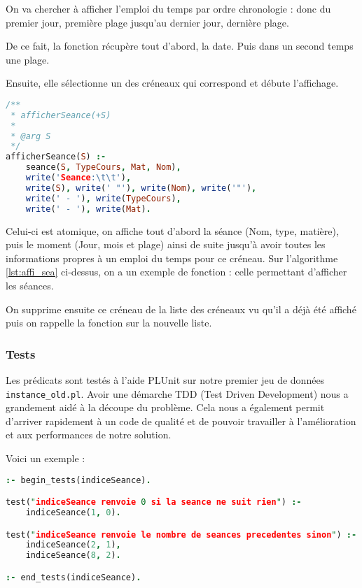 On va chercher à afficher l'emploi du temps par ordre chronologie : donc du premier jour, première plage jusqu'au dernier jour, dernière plage.

De ce fait, la fonction récupère tout d'abord, la date. Puis dans un second temps une plage.

Ensuite, elle sélectionne un des créneaux qui correspond et débute l'affichage.

\begin{lstlisting}[language=Prolog, caption=Affichage, captionpos=b,
label={lst:affi_sea}]
/**
 * afficherSeance(+S)
 *
 * @arg S
 */
afficherSeance(S) :-
    seance(S, TypeCours, Mat, Nom),
    write('Seance:\t\t'),
    write(S), write(' "'), write(Nom), write('"'),
    write(' - '), write(TypeCours),
    write(' - '), write(Mat).
\end{lstlisting}

Celui-ci est atomique, on affiche tout d'abord la séance (Nom, type, matière), puis le moment (Jour, mois et plage) ainsi de suite jusqu'à avoir toutes les informations propres à un emploi du temps pour ce créneau.
Sur l'algorithme \ref{lst:affi_sea} ci-dessus, on a un exemple de fonction : celle permettant d'afficher les séances.

On supprime ensuite ce créneau de la liste des créneaux vu qu'il a déjà été affiché puis on rappelle la fonction sur la nouvelle liste.

\subsubsection{Tests}

Les prédicats sont testés à l'aide PLUnit sur notre premier jeu de données
\texttt{instance\_old.pl}. Avoir une démarche TDD (Test Driven Development) nous
a grandement aidé à la découpe du problème. Cela nous a également permit
d'arriver rapidement à un code de qualité et de pouvoir travailler à
l'amélioration et aux performances de notre solution.

Voici un exemple :

\begin{lstlisting}[language=Prolog, caption=Exemple de test, captionpos=b,
label={lst:test}]
:- begin_tests(indiceSeance).

test("indiceSeance renvoie 0 si la seance ne suit rien") :-
    indiceSeance(1, 0).

test("indiceSeance renvoie le nombre de seances precedentes sinon") :-
    indiceSeance(2, 1),
    indiceSeance(8, 2).

:- end_tests(indiceSeance).
\end{lstlisting}

